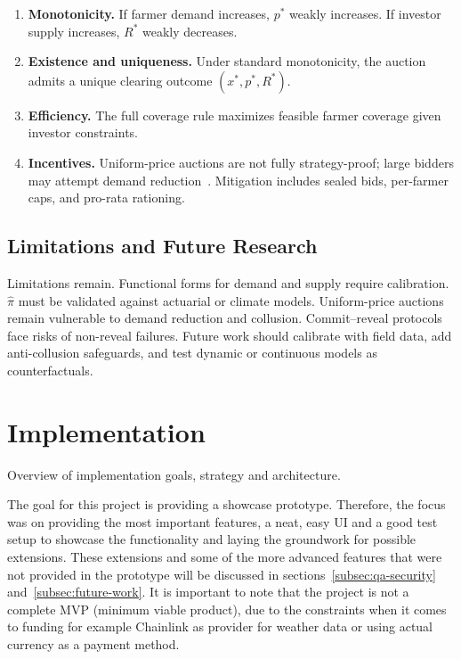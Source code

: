 \documentclass[11pt,a4paper]{article}
\begin{document}
        \begin{enumerate}[]
            \item \textbf{Monotonicity.} If farmer demand increases, $p^\ast$ weakly increases. If investor supply increases, $R^\ast$ weakly decreases.
            \item \textbf{Existence and uniqueness.} Under standard monotonicity, the auction admits a unique clearing outcome $(x^\ast,p^\ast,R^\ast)$.
            \item \textbf{Efficiency.} The full coverage rule maximizes feasible farmer coverage given investor constraints.
            \item \textbf{Incentives.} Uniform-price auctions are not fully strategy-proof; large bidders may attempt demand reduction~\parencite{ausubel2002demand}. Mitigation includes sealed bids, per-farmer caps, and pro-rata rationing.
        \end{enumerate}

            \subsection{Limitations and Future Research}\label{subsec:limitations-and-future-research}
        Limitations remain. Functional forms for demand and supply require calibration. $\hat{\pi}$ must be validated against actuarial or climate models.
        Uniform-price auctions remain vulnerable to demand reduction and collusion.
        Commit--reveal protocols face risks of non-reveal failures.
        Future work should calibrate with field data, add anti-collusion safeguards, and test dynamic or continuous models as counterfactuals.

		\section{Implementation}\label{sec:implementation}
		Overview of implementation goals, strategy and architecture.

		The goal for this project is providing a showcase prototype.
		Therefore, the focus was on providing the most important features, a neat, easy UI and a good test setup to showcase the functionality and laying the groundwork for possible extensions.
		These extensions and some of the more advanced features that were not provided in the prototype will be discussed in sections~\ref{subsec:qa-security} and~\ref{subsec:future-work}.
		It is important to note that the project is not a complete MVP (minimum viable product), due to the constraints when it comes to funding for example Chainlink as provider for weather data or using actual currency as a payment method.
\end{document}
